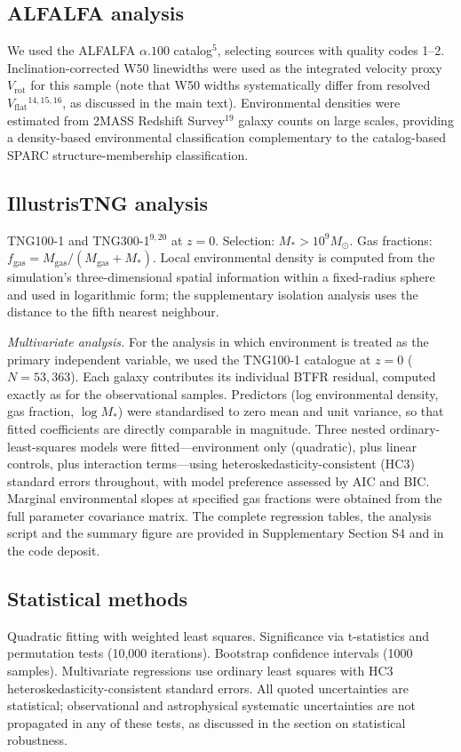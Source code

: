 \documentclass[11pt,a4paper]{article}
\begin{document}
\subsection*{ALFALFA analysis}
We used the ALFALFA $\alpha.100$ catalog$^{5}$, selecting sources with quality codes 1--2. Inclination-corrected W50 linewidths were used as the integrated velocity proxy $V_{\mathrm{rot}}$ for this sample (note that W50 widths systematically differ from resolved $V_{\mathrm{flat}}$$^{14,15,16}$, as discussed in the main text). Environmental densities were estimated from 2MASS Redshift Survey$^{19}$ galaxy counts on large scales, providing a density-based environmental classification complementary to the catalog-based SPARC structure-membership classification.

\subsection*{IllustrisTNG analysis}
TNG100-1 and TNG300-1$^{9,20}$ at $z = 0$. Selection: $M_* > 10^9 M_\odot$. Gas fractions: $f_{\mathrm{gas}} = M_{\mathrm{gas}}/(M_{\mathrm{gas}} + M_*)$. Local environmental density is computed from the simulation's three-dimensional spatial information within a fixed-radius sphere and used in logarithmic form; the supplementary isolation analysis uses the distance to the fifth nearest neighbour.

\textit{Multivariate analysis.} For the analysis in which environment is treated as the primary independent variable, we used the TNG100-1 catalogue at $z=0$ ($N = 53{,}363$). Each galaxy contributes its individual BTFR residual, computed exactly as for the observational samples. Predictors (log environmental density, gas fraction, $\log M_*$) were standardised to zero mean and unit variance, so that fitted coefficients are directly comparable in magnitude. Three nested ordinary-least-squares models were fitted---environment only (quadratic), plus linear controls, plus interaction terms---using heteroskedasticity-consistent (HC3) standard errors throughout, with model preference assessed by AIC and BIC. Marginal environmental slopes at specified gas fractions were obtained from the full parameter covariance matrix. The complete regression tables, the analysis script and the summary figure are provided in Supplementary Section S4 and in the code deposit.

\subsection*{Statistical methods}
Quadratic fitting with weighted least squares. Significance via t-statistics and permutation tests (10,000 iterations). Bootstrap confidence intervals (1000 samples). Multivariate regressions use ordinary least squares with HC3 heteroskedasticity-consistent standard errors. All quoted uncertainties are statistical; observational and astrophysical systematic uncertainties are not propagated in any of these tests, as discussed in the section on statistical robustness.
\end{document}
